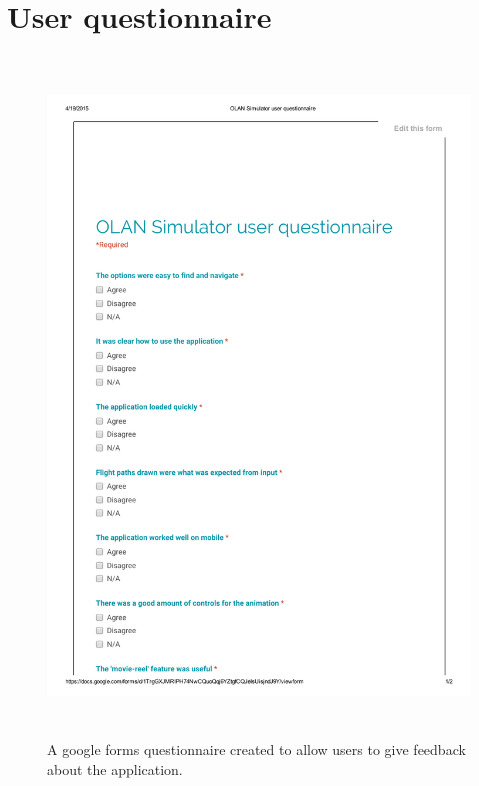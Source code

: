 \section{User questionnaire}
\label{test:questionnaire}
\begin{figure}[h!]
    \caption{A google forms questionnaire created to allow users to give feedback about the application.}
    \includegraphics[width=15cm,height=18cm,page=1]{images/questionnaire.pdf}
\end{figure}

